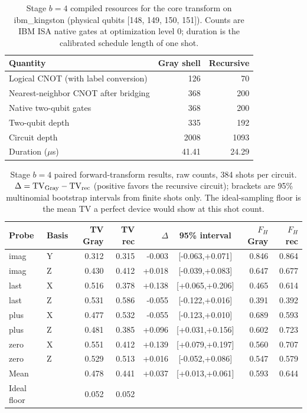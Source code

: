 \begin{table}[htbp]\centering\small
\caption{Stage $b=4$ compiled resources for the core transform on ibm\_kingston (physical qubits [148, 149, 150, 151]). Counts are IBM ISA native gates at optimization level 0; duration is the calibrated schedule length of one shot.}
\label{tab:hw-res-b4}\begin{tabular}{lrr}\toprule Quantity & Gray shell & Recursive\\\midrule
Logical CNOT (with label conversion) & 126 & 70\\
Nearest-neighbor CNOT after bridging & 368 & 200\\
Native two-qubit gates & 368 & 200\\
Two-qubit depth & 335 & 192\\
Circuit depth & 2008 & 1093\\
Duration ($\mu$s) & 41.41 & 24.29\\
\bottomrule\end{tabular}\end{table}

\begin{table}[htbp]\centering\small
\caption{Stage $b=4$ paired forward-transform results, raw counts, 384 shots per circuit. $\Delta=\mathrm{TV}_{\rm Gray}-\mathrm{TV}_{\rm rec}$ (positive favors the recursive circuit); brackets are 95\% multinomial bootstrap intervals from finite shots only. The ideal-sampling floor is the mean TV a perfect device would show at this shot count.}
\label{tab:hw-pairs-b4}\begin{tabular}{llrrrcrr}\toprule Probe & Basis & TV Gray & TV rec & $\Delta$ & 95\% interval & $F_H$ Gray & $F_H$ rec\\\midrule
imag & Y & 0.312 & 0.315 & -0.003 & [-0.063,+0.071] & 0.846 & 0.864\\
imag & Z & 0.430 & 0.412 & +0.018 & [-0.039,+0.083] & 0.647 & 0.677\\
last & X & 0.516 & 0.378 & +0.138 & [+0.065,+0.206] & 0.465 & 0.614\\
last & Z & 0.531 & 0.586 & -0.055 & [-0.122,+0.016] & 0.391 & 0.392\\
plus & X & 0.477 & 0.532 & -0.055 & [-0.123,+0.010] & 0.689 & 0.593\\
plus & Z & 0.481 & 0.385 & +0.096 & [+0.031,+0.156] & 0.602 & 0.723\\
zero & X & 0.551 & 0.412 & +0.139 & [+0.079,+0.197] & 0.560 & 0.707\\
zero & Z & 0.529 & 0.513 & +0.016 & [-0.052,+0.086] & 0.547 & 0.579\\
\midrule
Mean & & 0.478 & 0.441 & +0.037 & [+0.013,+0.061] & 0.593 & 0.644\\
Ideal floor & & 0.052 & 0.052 & & & &\\
\bottomrule\end{tabular}\end{table}

